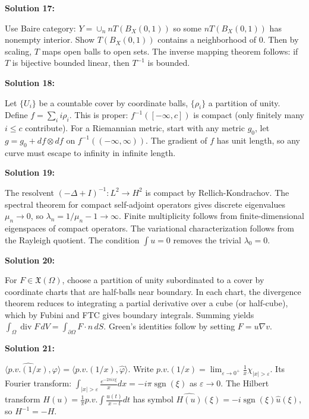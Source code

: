 \documentclass[12pt,a4paper]{exam}
\begin{document}
\vspace{0.5cm}

\textbf{Solution 17:}

Use Baire category: $Y = \cup_n n T(B_X(0,1))$ so some $nT(B_X(0,1))$ has nonempty interior. Show $T(B_X(0,1))$ contains a neighborhood of 0. Then by scaling, $T$ maps open balls to open sets. The inverse mapping theorem follows: if $T$ is bijective bounded linear, then $T^{-1}$ is bounded.

\vspace{0.5cm}

\textbf{Solution 18:}

Let $\{U_i\}$ be a countable cover by coordinate balls, $\{\rho_i\}$ a partition of unity. Define $f = \sum_i i \rho_i$. This is proper: $f^{-1}([-\infty, c])$ is compact (only finitely many $i \leq c$ contribute). For a Riemannian metric, start with any metric $g_0$, let $g = g_0 + df \otimes df$ on $f^{-1}((-\infty, \infty))$. The gradient of $f$ has unit length, so any curve must escape to infinity in infinite length.

\vspace{0.5cm}

\textbf{Solution 19:}

The resolvent $(-\Delta + I)^{-1}: L^2 \to H^2$ is compact by Rellich-Kondrachov. The spectral theorem for compact self-adjoint operators gives discrete eigenvalues $\mu_n \to 0$, so $\lambda_n = 1/\mu_n - 1 \to \infty$. Finite multiplicity follows from finite-dimensional eigenspaces of compact operators. The variational characterization follows from the Rayleigh quotient. The condition $\int u = 0$ removes the trivial $\lambda_0 = 0$.

\vspace{0.5cm}

\textbf{Solution 20:}

For $F \in \mathfrak{X}(\Omega)$, choose a partition of unity subordinated to a cover by coordinate charts that are half-balls near boundary. In each chart, the divergence theorem reduces to integrating a partial derivative over a cube (or half-cube), which by Fubini and FTC gives boundary integrals. Summing yields $\int_\Omega \operatorname{div} F \, dV = \int_{\partial\Omega} F \cdot n \, dS$. Green's identities follow by setting $F = u \nabla v$.

\vspace{0.5cm}

\textbf{Solution 21:}

$\langle \widehat{p.v.(1/x)}, \varphi \rangle = \langle p.v.(1/x), \widehat{\varphi} \rangle$. Write $p.v.(1/x) = \lim_{\varepsilon \to 0^+} \frac{1}{x} \chi_{|x|>\varepsilon}$. Its Fourier transform: $\int_{|x|>\varepsilon} \frac{e^{-2\pi i x \xi}}{x} dx = -i\pi \operatorname{sgn}(\xi)$ as $\varepsilon \to 0$. The Hilbert transform $H(u) = \frac{1}{\pi} p.v. \int \frac{u(t)}{x-t} dt$ has symbol $\widehat{H(u)}(\xi) = -i \operatorname{sgn}(\xi) \widehat{u}(\xi)$, so $H^{-1} = -H$.
\end{document}
